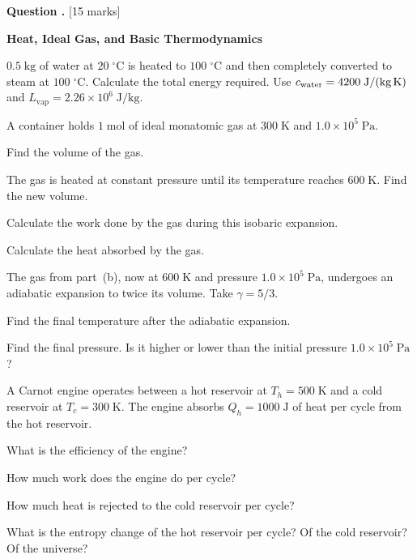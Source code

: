 \documentclass[12pt,a4paper]{article}
\newcounter{questioncounter}
\newcommand{\question}[1]{%
  \stepcounter{questioncounter}%
  \vspace{0.5cm}%
  \noindent\textbf{Question \thequestioncounter.} \hfill [#1 marks]%
  \vspace{0.2cm}%
  \par%
}
\begin{document}
\newpage

\question{15}

\noindent\textbf{Heat, Ideal Gas, and Basic Thermodynamics}

\begin{parts}
\item $0.5\;\text{kg}$ of water at $20\;^\circ\text{C}$ is heated to $100\;^\circ\text{C}$ and then completely converted to steam at $100\;^\circ\text{C}$. Calculate the total energy required. Use $c_\text{water} = 4200\;\text{J/(kg\,K)}$ and $L_\text{vap} = 2.26\times 10^6\;\text{J/kg}$. 

\item A container holds $1\;\text{mol}$ of ideal monatomic gas at $300\;\text{K}$ and $1.0\times 10^5\;\text{Pa}$.
\begin{parts}
\item Find the volume of the gas. 
\item The gas is heated at constant pressure until its temperature reaches $600\;\text{K}$. Find the new volume. 
\item Calculate the work done by the gas during this isobaric expansion. 
\item Calculate the heat absorbed by the gas. 
\end{parts}

\item The gas from part~(b), now at $600\;\text{K}$ and pressure $1.0\times 10^5\;\text{Pa}$, undergoes an adiabatic expansion to twice its volume. Take $\gamma = 5/3$.
\begin{parts}
\item Find the final temperature after the adiabatic expansion. 
\item Find the final pressure. Is it higher or lower than the initial pressure $1.0\times 10^5\;\text{Pa}$? 
\end{parts}

\item A Carnot engine operates between a hot reservoir at $T_h = 500\;\text{K}$ and a cold reservoir at $T_c = 300\;\text{K}$. The engine absorbs $Q_h = 1000\;\text{J}$ of heat per cycle from the hot reservoir.
\begin{parts}
\item What is the efficiency of the engine? 
\item How much work does the engine do per cycle? 
\item How much heat is rejected to the cold reservoir per cycle? 
\item What is the entropy change of the hot reservoir per cycle? Of the cold reservoir? Of the universe? 
\end{parts}
\end{parts}
\end{document}
